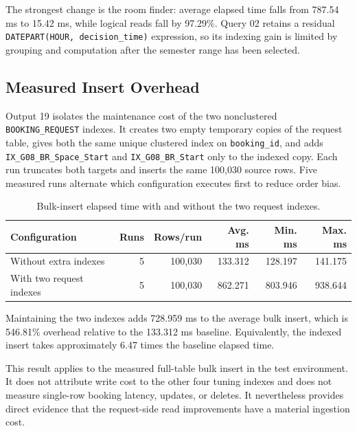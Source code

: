 The strongest change is the room finder: average elapsed time falls from 787.54 ms to 15.42 ms, while logical reads fall by 97.29\%. Query 02 retains a residual \texttt{DATEPART(HOUR, decision\_time)} expression, so its indexing gain is limited by grouping and computation after the semester range has been selected.

\subsection{Measured Insert Overhead}

Output 19 isolates the maintenance cost of the two nonclustered \texttt{BOOKING\_REQUEST} indexes. It creates two empty temporary copies of the request table, gives both the same unique clustered index on \texttt{booking\_id}, and adds \nolinkurl{IX_G08_BR_Space_Start} and \nolinkurl{IX_G08_BR_Start} only to the indexed copy. Each run truncates both targets and inserts the same 100,030 source rows. Five measured runs alternate which configuration executes first to reduce order bias.

\begin{table}[H]
  \centering
  \small
  \begin{tabular}{lrrrrr}
    \toprule
    \textbf{Configuration} & \textbf{Runs} & \textbf{Rows/run} & \textbf{Avg. ms} & \textbf{Min. ms} & \textbf{Max. ms}\\
    \midrule
    Without extra indexes & 5 & 100,030 & 133.312 & 128.197 & 141.175\\
    With two request indexes & 5 & 100,030 & 862.271 & 803.946 & 938.644\\
    \bottomrule
  \end{tabular}
  \caption{Bulk-insert elapsed time with and without the two request indexes.}
  \label{tab:index-write-overhead}
\end{table}

Maintaining the two indexes adds 728.959 ms to the average bulk insert, which is 546.81\% overhead relative to the 133.312 ms baseline. Equivalently, the indexed insert takes approximately 6.47 times the baseline elapsed time.

This result applies to the measured full-table bulk insert in the test environment. It does not attribute write cost to the other four tuning indexes and does not measure single-row booking latency, updates, or deletes. It nevertheless provides direct evidence that the request-side read improvements have a material ingestion cost.

